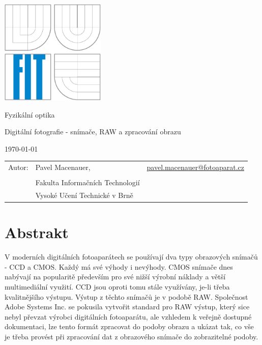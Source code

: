 \documentclass[12pt,a4paper,titlepage,final]{report}
\makeatletter
\newcommand{\abstractpage}{
\cleardoublepage
\noindent
\chapter*{Abstrakt}
}
\newcommand\Course{Fyzikální optika}
\newcommand\WorkTitle{Digitální fotografie - snímače, RAW a zpracování obrazu}
\newcommand\AuthorA{Pavel Macenauer}
\newcommand\AuthorAEmail{pavel.macenauer@fotoaparat.cz}
\newcommand\Faculty{Fakulta Informačních Technologií}
\newcommand\School{Vysoké Učení Technické v Brně}
\makeatother
\begin{document}
	\begin{titlepage}
	\begin{center}
		\includegraphics[height=5cm]{images/logo.eps}
	\end{center}
	\vfill
	\begin{center}
		\begin{Large}
			\Course\\
		\end{Large}
		\bigskip
		\begin{Huge}
			\WorkTitle\\
		\end{Huge}
	\end{center}
	\vfill
	\begin{center}
		\begin{large}
			\today
		\end{large}
	\end{center}
	\vfill
	\begin{flushleft}
		\begin{large}
			\begin{tabular}{lll}
				Autor: & \AuthorA, & \url{\AuthorAEmail} \\
		
				& & \\
				& \Faculty \\
				& \School \\
			\end{tabular}
		\end{large}
	\end{flushleft}
\end{titlepage}		

	
\abstractpage

V moderních digitálních fotoaparátech se používají dva typy obrazových snímačů - CCD a CMOS. Každý má své výhody i nevýhody. CMOS snímače dnes nabývají na popularitě především pro své nižší výrobní náklady a větší multimediální využití. CCD jsou oproti tomu stále využívány, je-li třeba kvalitnějšího výstupu. Výstup z těchto snímačů je v podobě RAW. Společnost Adobe Systems Inc. se pokusila vytvořit standard pro RAW výstup, který sice nebyl převzat výrobci digitálních fotoaparátu, ale vzhledem k veřejně dostupné dokumentaci, lze tento formát zpracovat do podoby obrazu a ukázat tak, co vše je třeba provést při zpracování dat z obrazového snímače do zobrazitelné podoby.
\end{document}
